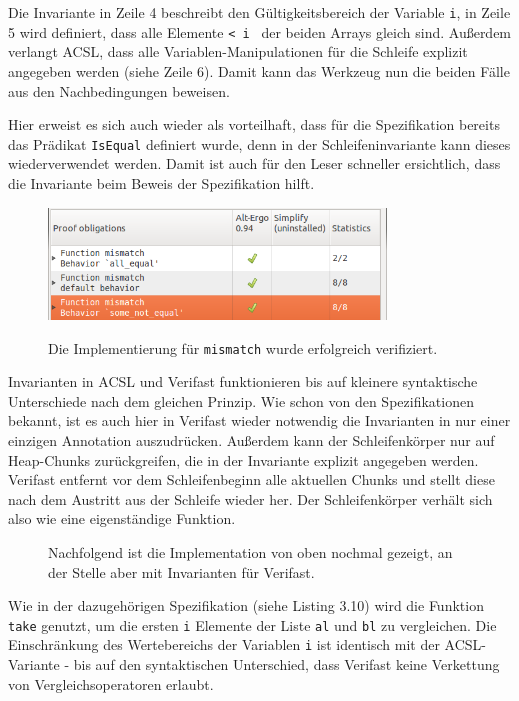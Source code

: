 Die Invariante in Zeile 4 beschreibt den Gültigkeitsbereich der Variable \lstinline{i}, in Zeile 5 wird definiert, 
dass alle Elemente \lstinline{< i } der beiden Arrays gleich sind. Außerdem verlangt ACSL, dass alle
Variablen-Manipulationen für die Schleife explizit angegeben werden (siehe Zeile 6). Damit kann das Werkzeug
nun die beiden Fälle aus den Nachbedingungen beweisen.

Hier erweist es sich auch wieder als vorteilhaft, dass für die Spezifikation bereits das Prädikat
\lstinline{IsEqual} definiert wurde, denn in der Schleifeninvariante kann dieses wiederverwendet werden. Damit
ist auch für den Leser schneller ersichtlich, dass die Invariante beim Beweis der Spezifikation hilft.

\begin{figure}[H]
	\centering
\includegraphics[width=0.8\textwidth]{images/acsl-prove-mismatch.png}

Die Implementierung für \lstinline{mismatch} wurde erfolgreich verifiziert.
\end{figure}

Invarianten in ACSL und Verifast funktionieren bis auf kleinere syntaktische Unterschiede nach dem gleichen Prinzip.
Wie schon von den Spezifikationen bekannt, ist es auch hier in Verifast wieder notwendig die Invarianten in nur
einer einzigen Annotation auszudrücken. Außerdem kann der Schleifenkörper nur auf Heap-Chunks zurückgreifen, die
in der Invariante explizit angegeben werden. Verifast entfernt vor dem Schleifenbeginn alle aktuellen Chunks
und stellt diese nach dem Austritt aus der Schleife wieder her. Der Schleifenkörper verhält sich also
wie eine eigenständige Funktion.

\begin{figure}[H]
Nachfolgend ist die Implementation von oben nochmal gezeigt, an der Stelle aber mit Invarianten für Verifast.


\end{figure} 

Wie in der dazugehörigen Spezifikation (siehe Listing 3.10) wird die Funktion \lstinline{take} genutzt,
um die ersten \lstinline{i} Elemente der Liste \lstinline{al} und \lstinline{bl} zu vergleichen.
Die Einschränkung des Wertebereichs der Variablen \lstinline{i} ist identisch mit der ACSL-Variante -
bis auf den syntaktischen Unterschied, dass Verifast keine Verkettung von Vergleichsoperatoren erlaubt.


